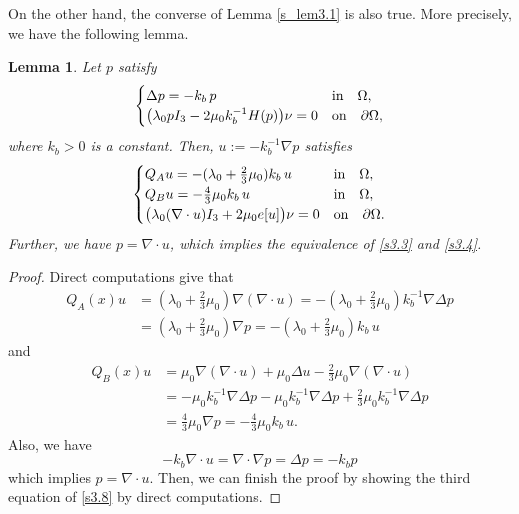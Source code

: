 \documentclass[a4paper,12pt]{article}
\newtheorem{lemma}[Th]{Lemma}
\newtheorem{a priori condition}[Th]{A priori condition}
\begin{document}
\medskip\noindent
On the other hand, the converse of Lemma \ref{s_lem3.1} is also true. More precisely, we have the following lemma.

\begin{lemma}\label{s_lem3.2}
Let  $p$ satisfy
\begin{equation}\label{s3.7}
\begin{array}{l}
\begin{cases}
\Delta p=-k_b\, p&\mbox{\rm in}\quad \Omega,\\
\big(\lambda_0p I_3 -2\mu_0k_b^{-1}H(p)\big)\nu=0    & {\rm on}\quad \partial\Omega,
\end{cases}
\end{array}
\end{equation}
where $k_b>0$ is a constant. 
Then, $u:=-k_b^{-1}\nabla p$ satisfies
\begin{equation}\label{s3.8}
\begin{array}{l}
\begin{cases}
Q_Au=-(\lambda_0+\frac{2}{3}\mu_0)k_b\, u\quad &\mbox{\rm in}\quad \Omega,\\
Q_Bu=-\frac{4}{3}\mu_0k_b\, u\quad &\mbox{\rm in}\quad \Omega,\\
\big(\lambda_0(\nabla \cdot u) I_3+2\mu_0e[u]\big)\nu=0     & {\rm on}\quad \partial\Omega.
\end{cases}
\end{array} 
\end{equation}
Further, we have $p=\nabla\cdot u$, which implies the equivalence of \eqref{s3.3} and \eqref{s3.4}.
\end{lemma}

\begin{proof}
Direct computations give that
\begin{equation}\label{s3.9}
\begin{array}{ll}
Q_A(x)u&=(\lambda_0+\frac{2}{3}\mu_0)\nabla (\nabla\cdot u) 
=-(\lambda_0+\frac{2}{3}\mu_0)k_b^{-1}\nabla \Delta p\\
&=(\lambda_0+\frac{2}{3}\mu_0)\nabla p
=-(\lambda_0+\frac{2}{3}\mu_0)k_b\,u
\end{array}
\end{equation}
and
\begin{equation}\label{s3.10}
\begin{array}{ll}
Q_B(x)u&=\mu_0\nabla (\nabla\cdot u)+\mu_0 \Delta u-\frac{2}{3}\mu_0 \nabla (\nabla\cdot u)\\
&=-\mu_0k_b^{-1}\nabla \Delta p-\mu_0 k_b^{-1}\nabla \Delta p+\frac{2}{3}\mu_0 k_b^{-1}\nabla \Delta p\\
&=\frac{4}{3}\mu_0\nabla p
=-\frac{4}{3}\mu_0k_b\,u.
\end{array}
\end{equation}
Also, we have
$$-k_b\nabla \cdot u=\nabla \cdot \nabla p=\Delta p=-k_b p$$
which implies $p=\nabla \cdot u$. Then, we can finish the proof by showing the third equation of \eqref{s3.8} by direct computations.
\end{proof}
\end{document}
